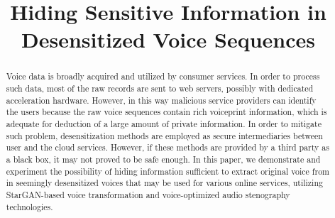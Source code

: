 \documentclass[conference]{IEEEtran}
\begin{document}
\title{Hiding Sensitive Information in Desensitized Voice Sequences\\}

\author{
\and
{}
\and
{}
\and
{}
}

\maketitle

\begin{abstract}
Voice data is broadly acquired and utilized by consumer services. In order to process such data, most of the raw records are sent to web servers, possibly with dedicated acceleration hardware. However, in this way malicious service providers can identify the users because the raw voice sequences contain rich voiceprint information, which is adequate for deduction of a large amount of private information. In order to mitigate such problem, desensitization methods are employed as secure intermediaries between user and the cloud services. However, if these methods are provided by a third party as a black box, it may not proved to be safe enough. In this paper, we demonstrate and experiment the possibility of hiding information sufficient to extract original voice from in seemingly desensitized voices that may be used for various online services, utilizing StarGAN-based voice transformation and voice-optimized audio stenography technologies.
\end{abstract}
\end{document}
